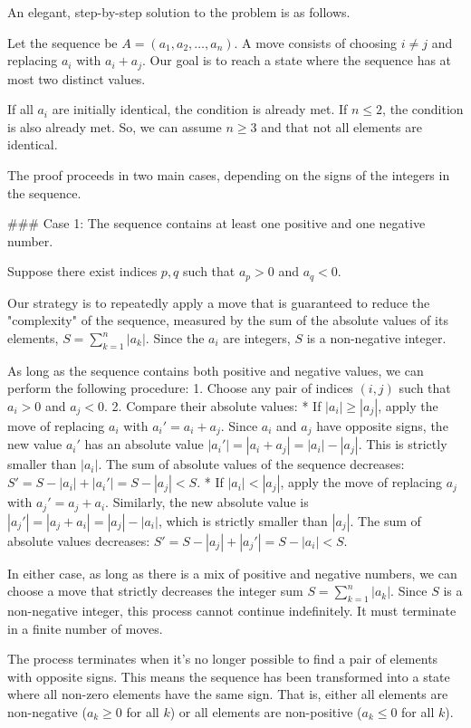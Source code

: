 An elegant, step-by-step solution to the problem is as follows.

Let the sequence be $A = (a_1, a_2, \dots, a_n)$. A move consists of choosing $i \neq j$ and replacing $a_i$ with $a_i+a_j$. Our goal is to reach a state where the sequence has at most two distinct values.

If all $a_i$ are initially identical, the condition is already met. If $n \le 2$, the condition is also already met. So, we can assume $n \ge 3$ and that not all elements are identical.

The proof proceeds in two main cases, depending on the signs of the integers in the sequence.

### Case 1: The sequence contains at least one positive and one negative number.

Suppose there exist indices $p, q$ such that $a_p > 0$ and $a_q < 0$.

Our strategy is to repeatedly apply a move that is guaranteed to reduce the "complexity" of the sequence, measured by the sum of the absolute values of its elements, $S = \sum_{k=1}^n |a_k|$. Since the $a_i$ are integers, $S$ is a non-negative integer.

As long as the sequence contains both positive and negative values, we can perform the following procedure:
1.  Choose any pair of indices $(i, j)$ such that $a_i > 0$ and $a_j < 0$.
2.  Compare their absolute values:
    *   If $|a_i| \ge |a_j|$, apply the move of replacing $a_i$ with $a_i' = a_i + a_j$. Since $a_i$ and $a_j$ have opposite signs, the new value $a_i'$ has an absolute value $|a_i'| = |a_i+a_j| = |a_i| - |a_j|$. This is strictly smaller than $|a_i|$. The sum of absolute values of the sequence decreases: $S' = S - |a_i| + |a_i'| = S - |a_j| < S$.
    *   If $|a_i| < |a_j|$, apply the move of replacing $a_j$ with $a_j' = a_j + a_i$. Similarly, the new absolute value is $|a_j'| = |a_j+a_i| = |a_j| - |a_i|$, which is strictly smaller than $|a_j|$. The sum of absolute values decreases: $S' = S - |a_j| + |a_j'| = S - |a_i| < S$.

In either case, as long as there is a mix of positive and negative numbers, we can choose a move that strictly decreases the integer sum $S = \sum_{k=1}^n |a_k|$. Since $S$ is a non-negative integer, this process cannot continue indefinitely. It must terminate in a finite number of moves.

The process terminates when it's no longer possible to find a pair of elements with opposite signs. This means the sequence has been transformed into a state where all non-zero elements have the same sign. That is, either all elements are non-negative ($a_k \ge 0$ for all $k$) or all elements are non-positive ($a_k \le 0$ for all $k$).

